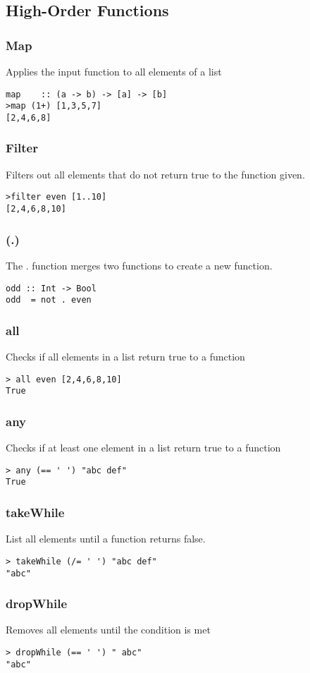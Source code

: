 \documentclass[12pt, oneside]{article}
\begin{document}
\subsection{High-Order Functions}
\subsubsection{Map}
Applies the input function to all elements of a list 
\begin{lstlisting}
map    :: (a -> b) -> [a] -> [b]
>map (1+) [1,3,5,7]
[2,4,6,8]
\end{lstlisting}
\subsubsection{Filter}
Filters out all elements that do not return true to the function given.
\begin{lstlisting}
>filter even [1..10]
[2,4,6,8,10]
\end{lstlisting}
\subsubsection{(.)}
The . function merges two functions to create a new function.
\begin{lstlisting}
odd :: Int -> Bool
odd  = not . even
\end{lstlisting}
\label{all}
\subsubsection{all}
Checks if all elements in a list return true to a function
\begin{lstlisting}
> all even [2,4,6,8,10]
True 
\end{lstlisting}
\label{any}
\subsubsection{any}
Checks if at least one element in a list return true to a function
\begin{lstlisting}
> any (== ' ') "abc def"
True 
\end{lstlisting}
\label{takeWhile}
\subsubsection{takeWhile}
List all elements until a function returns false.
\begin{lstlisting}
> takeWhile (/= ' ') "abc def"
"abc" 
\end{lstlisting}
\label{dropWhile}
\subsubsection{dropWhile}
Removes all elements until the condition is met
\begin{lstlisting}
> dropWhile (== ' ') " abc"
"abc"
\end{lstlisting}
\end{document}
